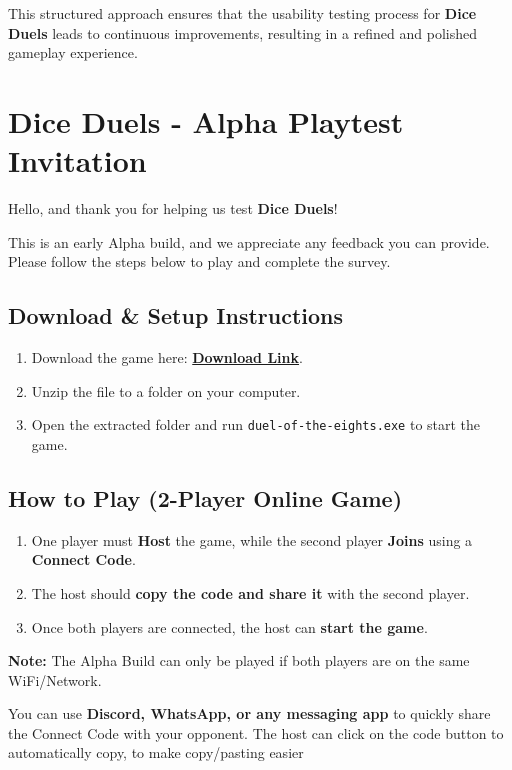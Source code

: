 \documentclass{article}
\begin{document}
This structured approach ensures that the usability testing process for \textbf{Dice Duels} leads to continuous improvements, resulting in a refined and polished gameplay experience.

\newpage

\section{Dice Duels - Alpha Playtest Invitation}

Hello, and thank you for helping us test \textbf{Dice Duels}!

This is an early Alpha build, and we appreciate any feedback you can provide. Please follow the steps below to play and complete the survey.

\subsection{Download \& Setup Instructions}
\begin{enumerate}
    \item Download the game here: \href{https://drive.google.com/file/d/1eDyBru4fAjn-ErjmaTQIKcBtgJJSfgcL/view?usp=sharing}{\textbf{Download Link}}.
    \item Unzip the file to a folder on your computer.
    \item Open the extracted folder and run \texttt{duel-of-the-eights.exe} to start the game.
\end{enumerate}

\subsection{How to Play (2-Player Online Game)}
\begin{enumerate}
    \item One player must \textbf{Host} the game, while the second player \textbf{Joins} using a \textbf{Connect Code}.
    \item The host should \textbf{copy the code and share it} with the second player.
    \item Once both players are connected, the host can \textbf{start the game}.
\end{enumerate}

\textbf{Note:} The Alpha Build can only be played if both players are on the same WiFi/Network.

\begin{tcolorbox}[colback=gray!10, colframe=black, title=Tip]
You can use \textbf{Discord, WhatsApp, or any messaging app} to quickly share the Connect Code with your opponent.
The host can click on the code button to automatically copy, to make copy/pasting easier
\end{tcolorbox}
\end{document}
